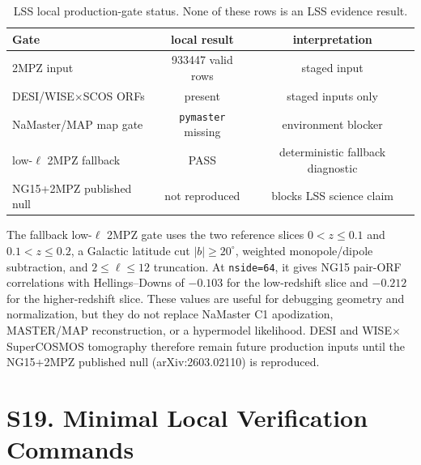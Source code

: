 \documentclass[aps,prl,superscriptaddress,nofootinbib]{revtex4-2}
\begin{document}
\begin{table}[H]
\caption{\label{tab:lss-gate}LSS local production-gate status.  None of these
rows is an LSS evidence result.}
\begin{ruledtabular}
\begin{tabular}{lcc}
Gate & local result & interpretation \\
\hline
2MPZ input & 933447 valid rows & staged input \\
DESI/WISE$\times$SCOS ORFs & present & staged inputs only \\
NaMaster/MAP map gate & \texttt{pymaster} missing & environment blocker \\
low-$\ell$ 2MPZ fallback & PASS & deterministic fallback diagnostic \\
NG15+2MPZ published null & not reproduced & blocks LSS science claim \\
\end{tabular}
\end{ruledtabular}
\end{table}

The fallback low-$\ell$ 2MPZ gate uses the two reference slices
$0<z\le0.1$ and $0.1<z\le0.2$, a Galactic latitude cut
$|b|\ge20^\circ$, weighted monopole/dipole subtraction, and
$2\le\ell\le12$ truncation.  At \texttt{nside=64}, it gives NG15 pair-ORF
correlations with Hellings--Downs of $-0.103$ for the low-redshift slice and
$-0.212$ for the higher-redshift slice.  These values are useful for
debugging geometry and normalization, but they do not replace NaMaster C1
apodization, MASTER/MAP reconstruction, or a hypermodel likelihood.  DESI and
WISE$\times$SuperCOSMOS tomography therefore remain future production inputs
until the NG15+2MPZ published null (arXiv:2603.02110) is reproduced.

\FloatBarrier
\clearpage

\section*{S19. Minimal Local Verification Commands}
\end{document}
